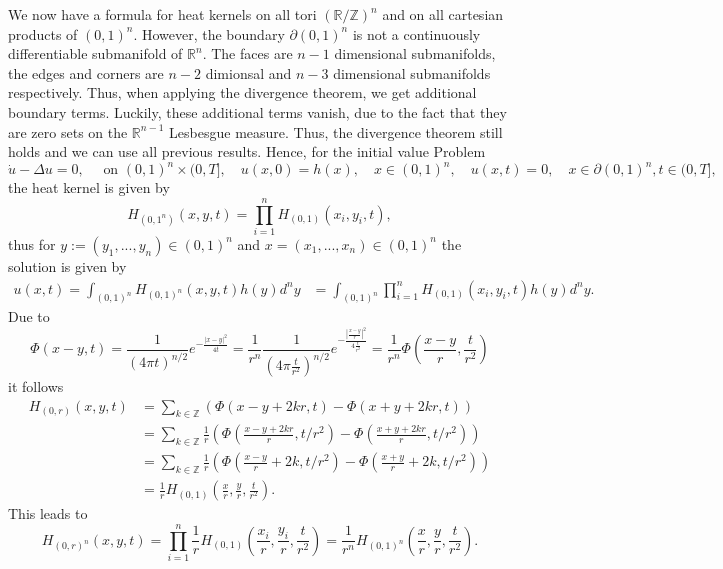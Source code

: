 \documentclass[A4,12pt,twoside]{book}
\begin{document}
We now have a formula for heat kernels on all tori $(\mathbb{R}/\mathbb{Z})^n$ and on all cartesian products of $(0,1)^n$. However, the boundary $\partial (0,1)^n$ is not a continuously differentiable submanifold of $\mathbb{R}^n$. The faces are $n-1$ dimensional submanifolds, the edges and corners are $n-2$ dimionsal and $n-3$ dimensional submanifolds respectively. Thus, when applying the divergence theorem, we get additional boundary terms. Luckily, these additional terms vanish, due to the fact that they are zero sets on the $\mathbb{R}^{n-1}$ Lesbesgue measure. Thus, the divergence theorem still holds and we can use all previous results. Hence, for the initial value Problem
\[
\dot{ u} - \Delta u=0, \quad \text{ on } (0,1)^n \times (0,T], \quad u(x,0)=h(x), \quad x \in (0,1)^n, \quad u(x,t) =0, \quad x \in \partial (0,1)^n, t \in (0,T],
\]
the heat kernel is given by 
\[
H_{(0,1^n)}(x,y,t) = \prod_{i=1}^n H_{(0,1)} (x_i,y_i,t),
\]
thus for $y:= (y_1,...,y_n) \in (0,1)^n$ and $x=(x_1,...,x_n) \in (0,1)^n$ the solution is given by  
\begin{align*}
    u(x,t) = \int_{(0,1)^n} H_{(0,1)^n} (x,y,t) h(y) d^n y &= \int_{(0,1)^n} \prod_{i=1}^n H_{(0,1)} (x_i,y_i,t) h(y) d^n y .
\end{align*}
Due to 
\[
\Phi (x-y,t) = \frac{1}{(4 \pi t)^{n/2}} e^{- \frac{|x-y|^2}{4t}} = \frac{1}{r^n} \frac{1}{(4 \pi \frac{t}{r^2})^{n/2}} e^{- \frac{|\frac{x-y}{r}|^2}{4\frac{t}{r^2}}} = \frac{1}{r^n} \Phi \left( \frac{x-y}{r}, \frac{t}{r^2} \right) 
\]
it follows 
\begin{align*}
    H_{(0,r)} (x,y,t) &= \sum_{k \in \mathbb{Z}} \left( \Phi (x-y +2 kr,t) - \Phi (x+y+2kr,t) \right) \\
    &= \sum_{k \in \mathbb{Z}} \frac{1}{r} \left( \Phi (\frac{x-y +2 kr}{r},t/r^2) - \Phi (\frac{x+y+2kr}{r},t/r^2) \right) \\
    &= \sum_{k \in \mathbb{Z}} \frac{1}{r} \left( \Phi (\frac{x-y }{r} +2k,t/r^2) - \Phi (\frac{x+y}{r}+2k,t/r^2) \right) \\
    &= \frac{1}{r} H_{(0,1)} \left( \frac{x}{r}, \frac{y}{r}, \frac{t}{r^2} \right).
\end{align*}
This leads to 
\[
 H_{(0,r)^n} (x,y,t) = \prod_{i=1}^n \frac{1}{r} H_{(0,1)} \left( \frac{x_i}{r}, \frac{y_i}{r}, \frac{t}{r^2} \right) = \frac{1}{r^n} H_{(0,1)^n} \left( \frac{x}{r}, \frac{y}{r}, \frac{t}{r^2} \right).
\]
\end{document}
